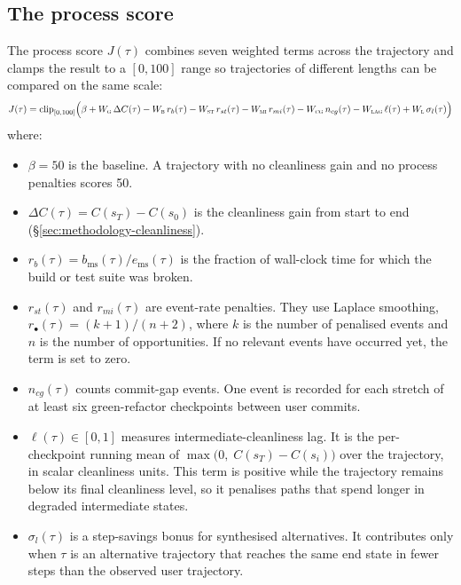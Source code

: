 \subsection{The process score}
\label{sec:methodology-score}

The process score $J(\tau)$ combines seven weighted terms across the trajectory and clamps the result to a $[0, 100]$ range so trajectories of different lengths can be compared on the same scale:
\begin{equation}
J(\tau) = \mathrm{clip}_{[0,100]}\Big(\beta + W_{\textsc{g}}\,\Delta C(\tau) - W_{\textsc{b}}\,r_b(\tau) - W_{\textsc{st}}\,r_{st}(\tau) - W_{\textsc{mi}}\,r_{mi}(\tau) - W_{\textsc{cg}}\,n_{cg}(\tau) - W_{\textsc{lag}}\,\ell(\tau) + W_{\textsc{l}}\,\sigma_l(\tau)\Big)
\label{eq:process-score}
\end{equation}
where:
\begin{itemize}
  \item $\beta = 50$ is the baseline. A trajectory with no cleanliness gain and no process penalties scores 50.
  \item $\Delta C(\tau) = C(s_T) - C(s_0)$ is the cleanliness gain from start to end (\S\ref{sec:methodology-cleanliness}).
  \item $r_b(\tau) = b_{\mathrm{ms}}(\tau) / e_{\mathrm{ms}}(\tau)$ is the fraction of wall-clock time for which the build or test suite was broken.
  \item $r_{st}(\tau)$ and $r_{mi}(\tau)$ are event-rate penalties. They use Laplace smoothing, $r_\bullet(\tau) = (k + 1) / (n + 2)$, where $k$ is the number of penalised events and $n$ is the number of opportunities. If no relevant events have occurred yet, the term is set to zero.
  \item $n_{cg}(\tau)$ counts commit-gap events. One event is recorded for each stretch of at least six green-refactor checkpoints between user commits.
  \item $\ell(\tau) \in [0, 1]$ measures intermediate-cleanliness lag. It is the per-checkpoint running mean of $\max\!\big(0,\; C(s_T) - C(s_i)\big)$ over the trajectory, in scalar cleanliness units. This term is positive while the trajectory remains below its final cleanliness level, so it penalises paths that spend longer in degraded intermediate states.
  \item $\sigma_l(\tau)$ is a step-savings bonus for synthesised alternatives. It contributes only when $\tau$ is an alternative trajectory that reaches the same end state in fewer steps than the observed user trajectory.
\end{itemize}

